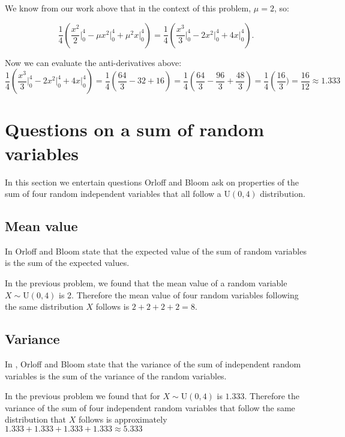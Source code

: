 \documentclass[a4paper,11pt]{article}
\begin{document}
We know from our work above that in the context of this problem, $\mu=2$, so:


\begin{equation}
  \frac{1}{4} \left( \frac{x^2}{2} \bigg\rvert_0^4 - \mu x^2 \bigg\rvert_0^4
    + \mu^2 x \bigg\rvert_0^4 \right) =
    \frac{1}{4} \left( \frac{x^3}{3} \bigg\rvert_0^4 - 2 x^2 \bigg\rvert_0^4
    + 4 x \bigg\rvert_0^4 \right).
\end{equation}

Now we can evaluate the anti-derivatives above:
\begin{equation}
    \frac{1}{4} \left( \frac{x^3}{3} \bigg\rvert_0^4 - 2 x^2 \bigg\rvert_0^4
    + 4 x \bigg\rvert_0^4 \right) =
    \frac{1}{4} \left( \frac{64}{3} - 32 + 16 \right)
    = \frac{1}{4} \left( \frac{64}{3} - \frac{96}{3} + \frac{48}{3} \right)
    = \frac{1}{4} \left(\frac{16}{3})
    =\frac{16}{12} \approx 1.333
\end{equation}

\section{Questions on a sum of random variables}
In this section we entertain questions Orloff and Bloom ask on properties of the
sum of four random independent variables that all follow a U$\left(0,4 \right)$
distribution.

\subsection{Mean value}
In \cite{reading6a} Orloff and Bloom state that the expected value
of the sum of random variables is the sum of the expected values.

In the previous problem, we found that the mean value of a random variable
$X \sim \text{U}\left( 0,4 \right)$ is 2.  Therefore the mean value of
four random variables following the same distribution $X$ follows is
$2+2+2+2=8$.

\subsection{Variance}

In \cite{reading6a}, Orloff and Bloom state that the variance of the sum of
independent random variables is the sum of the variance of the random variables.

In the previous problem we found that for $X \sim \text{U}\left( 0,4 \right)$
is $1.333$.  Therefore the variance of the sum of four independent random
variables that follow the same distribution that $X$ follows is approximately
$1.333 + 1.333 + 1.333 + 1.333 \approx 5.333$
\end{document}
